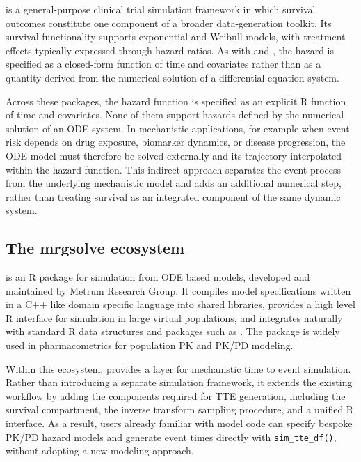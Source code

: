  \citep{simstudy} is a general-purpose clinical trial simulation framework in which survival outcomes constitute one component of a broader data-generation toolkit. Its survival functionality supports exponential and Weibull models, with treatment effects typically expressed through hazard ratios. As with  and , the hazard is specified as a closed-form function of time and covariates rather than as a quantity derived from the numerical solution of a differential equation system.

Across these packages, the hazard function is specified as an explicit R function of time and covariates. None of them support hazards defined by the numerical solution of an ODE system. In mechanistic applications, for example when event risk depends on drug exposure, biomarker dynamics, or disease progression, the ODE model must therefore be solved externally and its trajectory interpolated within the hazard function. This indirect approach separates the event process from the underlying mechanistic model and adds an additional numerical step, rather than treating survival as an integrated component of the same dynamic system.

\subsection{The mrgsolve ecosystem}\label{the-mrgsolve-ecosystem}

 \citep{mrgsolve} is an R package for simulation from ODE based models, developed and maintained by Metrum Research Group. It compiles model specifications written in a C++ like domain specific language into shared libraries, provides a high level R interface for simulation in large virtual populations, and integrates naturally with standard R data structures and packages such as . The package is widely used in pharmacometrics for population PK and PK/PD modeling.

Within this ecosystem,  provides a layer for mechanistic time to event simulation. Rather than introducing a separate simulation framework, it extends the existing  workflow by adding the components required for TTE generation, including the survival compartment, the inverse transform sampling procedure, and a unified R interface. As a result, users already familiar with  model code can specify bespoke PK/PD hazard models and generate event times directly with \texttt{sim\_tte\_df()}, without adopting a new modeling approach.

